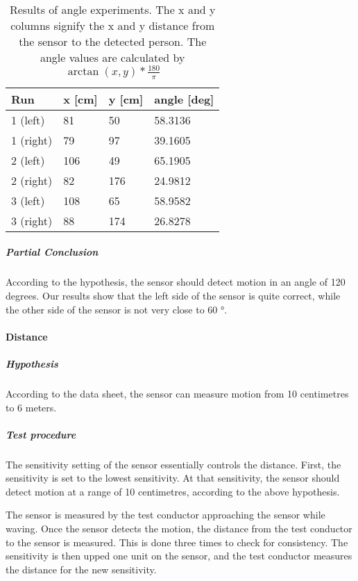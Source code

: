 \begin{table}[htbp]
\centering
\begin{tabular}{@{}llll@{}}
\toprule
Run & x [cm] & y [cm] & angle [deg] \\ \midrule
1 (left) & 81 & 50 & 58.3136 \\
1 (right) & 79 & 97 & 39.1605  \\ \midrule
2 (left) & 106 & 49 & 65.1905 \\
2 (right) & 82 & 176 & 24.9812 \\ \midrule
3 (left) & 108 & 65 & 58.9582 \\
3 (right) & 88 & 174 & 26.8278 \\ \bottomrule
\end{tabular}
\caption{Results of angle experiments. The x and y columns signify the x and y
  distance from the sensor to the detected person. The angle values are
  calculated by $\arctan (x,y) * \frac{180}{\pi}$}
\label{tab:pir_angle}
\end{table}

\subparagraph{Partial Conclusion}
\label{subp:AngPartial_conclusion}

According to the hypothesis, the sensor should detect motion in an angle of 120
degrees. Our results show that the left side of the sensor is quite correct,
while the other side of the sensor is not very close to 60 $\si{\degree}$.

\paragraph{Distance}

\subparagraph{Hypothesis}

According to the data sheet, the sensor can measure motion from 10 centimetres to
6 meters.

\subparagraph{Test procedure}

The sensitivity setting of the sensor essentially controls the distance. First,
the sensitivity is set to the lowest sensitivity. At that sensitivity, the
sensor should detect motion at a range of 10 centimetres, according to the above
hypothesis.

The sensor is measured by the test conductor approaching the sensor while
waving. Once the sensor detects the motion, the distance from the test conductor
to the sensor is measured. This is done three times to check for consistency. The sensitivity is then upped one unit on the sensor,
and the test conductor measures the distance for the new sensitivity.

